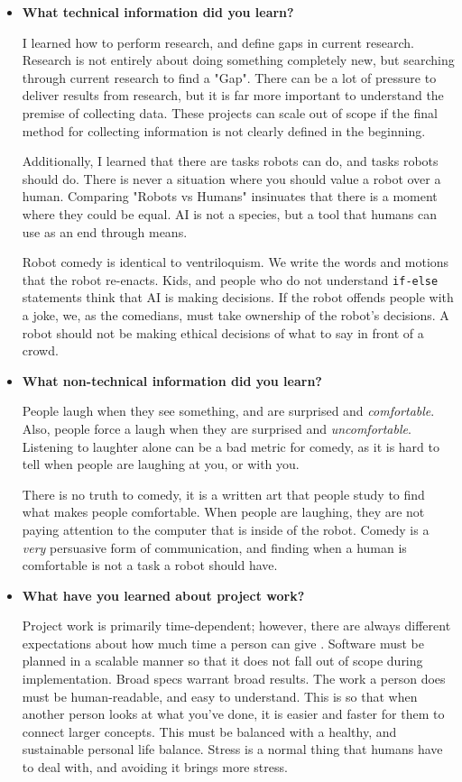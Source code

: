 \documentclass[onecolumn, draftclsnofoot,10pt, compsoc]{IEEEtran}
\begin{document}
\begin{itemize}
\item{\textbf{What technical information did you learn?}}

    I learned how to perform research, and define gaps in current research. 
    Research is not entirely about doing something completely new, but searching through current research to find a "Gap".
    There can be a lot of pressure to deliver results from research, but it is far more important to understand the premise of collecting data.
    These projects can scale out of scope if the final method for collecting information is not clearly defined in the beginning. 

    Additionally, I learned that there are tasks robots can do, and tasks robots should do.
    There is never a situation where you should value a robot over a human.
    Comparing "Robots vs Humans" insinuates that there is a moment where they could be equal.
    AI is not a species, but a tool that humans can use as an end through means.  

    Robot comedy is identical to ventriloquism. 
    We write the words and motions that the robot re-enacts.
    Kids, and people who do not understand \texttt{if-else} statements think that AI is making decisions.
    If the robot offends people with a joke, we, as the comedians, must take ownership of the robot's decisions. 
    A robot should not be making ethical decisions of what to say in front of a crowd. 

    
\item{\textbf{What non-technical information did you learn?}}

   
    People laugh when they see something, and are surprised and \textit{comfortable}.
    Also, people force a laugh when they are surprised and \textit{uncomfortable}.
    Listening to laughter alone can be a bad metric for comedy, as it is hard to tell when people are laughing at you, or with you.

    There is no truth to comedy, it is a written art that people study to find what makes people comfortable.
    When people are laughing, they are not paying attention to the computer that is inside of the robot.
    Comedy is a \textit{very} persuasive form of communication, and finding when a human is comfortable is not a task a robot should have.
  

\item{\textbf{What have you learned about project work?}}

    Project work is primarily time-dependent; however, there are always different expectations about how much time a person can give \cite{theMythicalManMonth}.
    Software must be planned in a scalable manner so that it does not fall out of scope during implementation.
    Broad specs warrant broad results.
    The work a person does must be human-readable, and easy to understand. 
    This is so that when another person looks at what you've done, it is easier and faster for them to connect larger concepts.
    This must be balanced with a healthy, and sustainable personal life balance.
    Stress is a normal thing that humans have to deal with, and avoiding it brings more stress.



\end{itemize}
\end{document}
